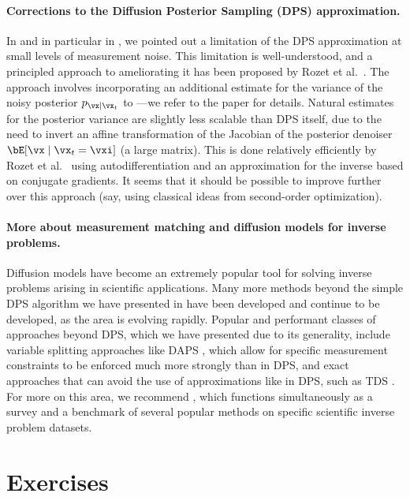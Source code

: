 \documentclass[../../book-main.tex]{subfiles}
\begin{document}
\paragraph{Corrections to the Diffusion Posterior Sampling (DPS) approximation.}
In  and in particular in
, we pointed out
a limitation of the DPS approximation
 at
small levels of measurement noise. 
This limitation is well-understood, and a principled approach to ameliorating it
has been proposed by Rozet et al.\ \cite{rozet2024learning}.
The approach involves incorporating an additional estimate for the variance of
the noisy posterior $p_{\vx \mid \vx_t}$ to
---we
refer to the paper for details.
Natural estimates for the posterior variance are slightly less scalable than DPS
itself, due to the need to invert an affine transformation of the Jacobian of
the posterior denoiser $\bE[\vx \mid \vx_t=\vxi]$ (a large matrix). This is done
relatively efficiently by Rozet et al.\ \cite{rozet2024learning} using autodifferentiation and an
approximation for the inverse based on conjugate gradients. It seems that it
should be possible to improve further over this approach (say, using classical
ideas from second-order optimization).


\paragraph{More about measurement matching and diffusion models for inverse
problems.} 

Diffusion models have become an extremely popular tool for solving inverse
problems arising in scientific applications. Many more methods beyond the simple
DPS algorithm we have presented in  have been
developed and continue to be developed, as the area is evolving rapidly.
Popular and performant classes of approaches beyond DPS, which we have presented
due to its generality, include variable splitting approaches like DAPS
\cite{Zhang2024-ha},
which allow for specific measurement constraints to be enforced much more
strongly than in DPS, and exact approaches that can avoid the use of
approximations like in DPS, such as TDS \cite{wu2023practical}.
For more on this area, we recommend \cite{zheng2025inversebench}, which
functions simultaneously as a survey and a benchmark of several popular methods
on specific scientific inverse problem datasets.

\section{Exercises}
\end{document}
